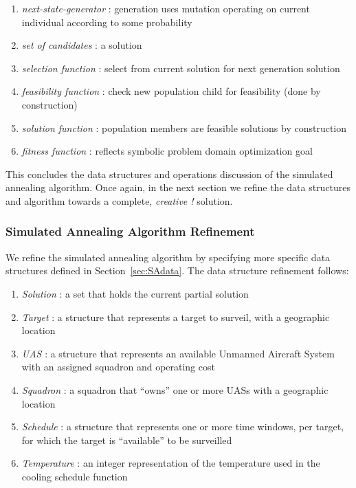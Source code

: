 \documentclass[conference]{IEEEtran}
\begin{document}
\begin{enumerate}
  \item[] \emph{next-state-generator} : generation uses mutation operating on
    current individual according to some probability
  \item[] \emph{set of candidates} : a solution
  \item[] \emph{selection function} : select from current solution for next
    generation solution
  \item[] \emph{feasibility function} : check new population child for
    feasibility (done by construction)
  \item[] \emph{solution function} : population members are feasible solutions
    by construction
  \item[] \emph{fitness function} : reflects symbolic problem domain
    optimization goal
\end{enumerate}

This concludes the data structures and operations discussion of the simulated
annealing algorithm. Once again, in the next section we refine the data
structures and algorithm towards a complete, \emph{creative !} solution.


\subsubsection{Simulated Annealing Algorithm Refinement}

We refine the simulated annealing algorithm by specifying more specific data
structures defined in Section~\ref{sec:SAdata}. The data structure refinement
follows:

\begin{enumerate}
  \item[] \emph{Solution} : a set that holds the current partial solution
  \item[] \emph{Target} : a structure that represents a target to surveil, with
    a geographic location
  \item[] \emph{UAS} : a structure that represents an available Unmanned
    Aircraft System with an assigned squadron and operating cost
  \item[] \emph{Squadron} : a squadron that ``owns'' one or more UASs with a
    geographic location
  \item[] \emph{Schedule} : a structure that represents one or more time
    windows, per target, for which the target is ``available'' to be surveilled
  \item[] \emph{Temperature} : an integer representation of the temperature
    used in the cooling schedule function
\end{enumerate}
\end{document}
